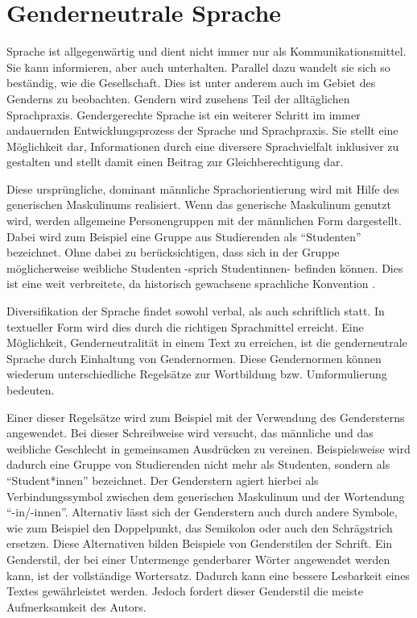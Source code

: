 \section{Genderneutrale Sprache}
\label{sec:sprache}

Sprache ist allgegenwärtig und dient nicht immer nur als Kommunikationsmittel. 
Sie kann informieren, aber auch unterhalten. Parallel dazu wandelt sie sich so beständig, wie die Gesellschaft. Dies ist unter anderem auch im Gebiet des Genderns zu beobachten. Gendern wird zusehens Teil der alltäglichen Sprachpraxis. Gendergerechte Sprache ist ein weiterer Schritt im immer andauernden Entwicklungsprozess der Sprache und Sprachpraxis. Sie stellt eine Möglichkeit dar, Informationen durch eine diversere Sprachvielfalt inklusiver zu gestalten und stellt damit einen Beitrag zur Gleichberechtigung dar.

Diese ursprüngliche, dominant männliche Sprachorientierung wird mit Hilfe des generischen Maskulinums realisiert. Wenn das generische Maskulinum genutzt wird, werden allgemeine Personengruppen mit der männlichen Form dargestellt. Dabei wird zum Beispiel eine Gruppe aus Studierenden als ``Studenten'' bezeichnet. Ohne dabei zu berücksichtigen, dass sich in der Gruppe möglicherweise weibliche Studenten -sprich Studentinnen- befinden können. Dies ist eine weit verbreitete, da historisch gewachsene sprachliche Konvention \cite{Hei00}.

Diversifikation der Sprache findet sowohl verbal, als auch schriftlich statt. In textueller Form wird dies durch die richtigen Sprachmittel erreicht. Eine Möglichkeit, Genderneutralität in einem Text zu erreichen, ist die genderneutrale Sprache durch Einhaltung von Gendernormen. Diese Gendernormen können wiederum unterschiedliche Regelsätze zur Wortbildung bzw. Umformulierung bedeuten.

Einer dieser Regelsätze wird zum Beispiel mit der Verwendung des Gendersterns angewendet. Bei dieser Schreibweise wird versucht, das männliche und das weibliche Geschlecht in gemeinsamen Ausdrücken zu vereinen. Beispielsweise wird dadurch eine Gruppe von Studierenden nicht mehr als Studenten, sondern als ``Student*innen'' bezeichnet. Der Genderstern agiert hierbei als Verbindungssymbol zwischen dem generischen Maskulinum und der Wortendung ``-in/-innen''. Alternativ lässt sich der Genderstern auch durch andere Symbole, wie zum Beispiel den Doppelpunkt, das Semikolon oder auch den Schrägstrich ersetzen. Diese Alternativen bilden Beispiele von Genderstilen der Schrift. Ein Genderstil, der bei einer Untermenge genderbarer Wörter angewendet werden kann, ist der vollständige Wortersatz. Dadurch kann eine bessere Lesbarkeit eines Textes gewährleistet werden. Jedoch fordert dieser Genderstil die meiste Aufmerksamkeit des Autors.

